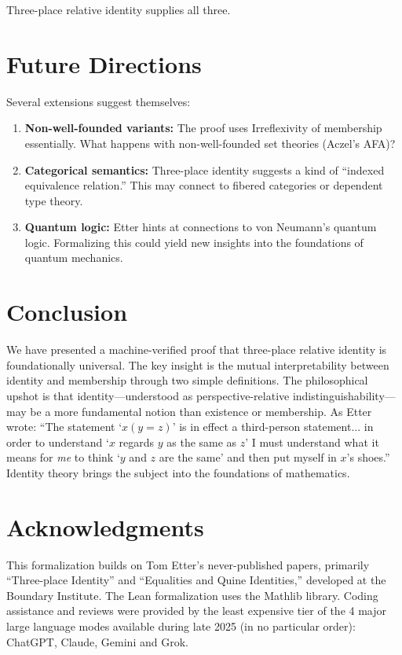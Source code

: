 \documentclass[11pt, a4paper]{article}
\theoremstyle{remark}
\begin{document}
Three-place relative identity supplies all three.

\section{Future Directions}

Several extensions suggest themselves:

\begin{enumerate}
    \item \textbf{Non-well-founded variants:} The proof uses Irreflexivity of membership essentially. What happens with non-well-founded set theories (Aczel's AFA)?
    \item \textbf{Categorical semantics:} Three-place identity suggests a kind of ``indexed equivalence relation.'' This may connect to fibered categories or dependent type theory.
    \item \textbf{Quantum logic:} Etter hints at connections to von Neumann's quantum logic. Formalizing this could yield new insights into the foundations of quantum mechanics.
\end{enumerate}

\section{Conclusion}

We have presented a machine-verified proof that three-place relative identity is foundationally universal. The key insight is the mutual interpretability between identity and membership through two simple definitions. The philosophical upshot is that identity---understood as perspective-relative indistinguishability---may be a more fundamental notion than existence or membership. As Etter wrote: ``The statement `$x(y=z)$' is in effect a third-person statement... in order to understand `$x$ regards $y$ as the same as $z$' I must understand what it means for \emph{me} to think `$y$ and $z$ are the same' and then put myself in $x$'s shoes.'' Identity theory brings the subject into the foundations of mathematics.

\section*{Acknowledgments}

This formalization builds on Tom Etter's never-published papers, primarily ``Three-place Identity'' and ``Equalities and Quine Identities,'' developed at the Boundary Institute. The Lean formalization uses the Mathlib library\cite{mathlib}. Coding assistance and reviews were provided by the least expensive tier of the 4 major large language modes available during late 2025 (in no particular order): ChatGPT, Claude, Gemini and Grok.
\end{document}
